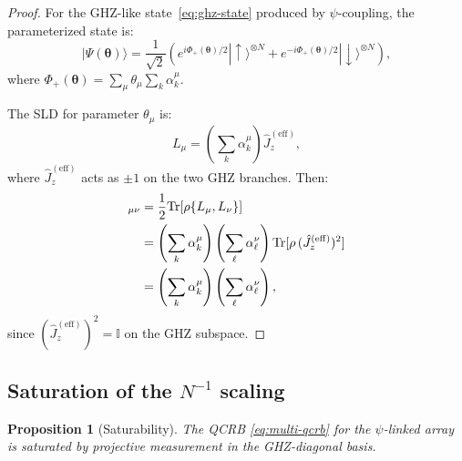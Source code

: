 \documentclass[aps,prl,twocolumn,superscriptaddress,showpacs]{revtex4-2}
\newtheorem{proposition}[theorem]{Proposition}
\theoremstyle{definition}
\newcommand{\Tr}{\mathrm{Tr}}
\begin{document}
\begin{proof}
For the GHZ-like state~\eqref{eq:ghz-state} produced by $\psi$-coupling,
the parameterized state is:
\begin{equation}
|\Psi(\boldsymbol{\theta})\rangle = \frac{1}{\sqrt{2}}\left(
e^{i\Phi_+(\boldsymbol{\theta})/2}|{\uparrow}\rangle^{\otimes N}
+ e^{-i\Phi_+(\boldsymbol{\theta})/2}|{\downarrow}\rangle^{\otimes N}
\right),
\end{equation}
where $\Phi_+(\boldsymbol{\theta}) = \sum_\mu\theta_\mu\sum_k\alpha_k^\mu$.

The SLD for parameter $\theta_\mu$ is:
\begin{equation}
L_\mu = \left(\sum_k \alpha_k^\mu\right)\hat{J}_z^{(\mathrm{eff})},
\end{equation}
where $\hat{J}_z^{(\mathrm{eff})}$ acts as $\pm 1$ on the two GHZ
branches. Then:
\begin{align}
[\mathcal{F}_Q]_{\mu\nu} &= \frac{1}{2}\Tr[\rho\{L_\mu,L_\nu\}] \notag\\
&= \left(\sum_k\alpha_k^\mu\right)\left(\sum_\ell\alpha_\ell^\nu\right)
\Tr[\rho\,(\hat{J}_z^{(\mathrm{eff})})^2] \notag\\
&= \left(\sum_k\alpha_k^\mu\right)\left(\sum_\ell\alpha_\ell^\nu\right),
\end{align}
since $(\hat{J}_z^{(\mathrm{eff})})^2 = \mathbb{I}$ on the GHZ subspace.
\end{proof}

\subsection{Saturation of the $N^{-1}$ scaling}

\begin{proposition}[Saturability]\label{prop:saturability}
The QCRB \eqref{eq:multi-qcrb} for the $\psi$-linked array is
saturated by projective measurement in the GHZ-diagonal basis.
\end{proposition}
\end{document}
